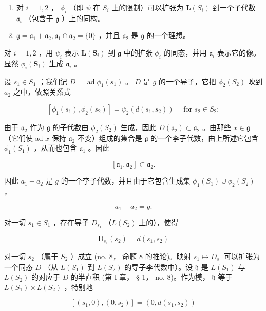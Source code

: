 \begin{enumerate}
\def\labelenumi{(\alph{enumi})}
\item
  对 \(i = 1,2\) ， \(\phi_{i}\) （即 \(\psi\) 在 \(S_{i}\) 上的限制）可以扩张为 \(\mathbf{L}(S_i)\) 到一个子代数 \(\mathfrak{a}_i\) （包含于 \(\mathfrak{g}\) ）上的同构。
\item
  \(\mathfrak{g} = \mathfrak{a}_1 + \mathfrak{a}_2, \mathfrak{a}_1 \cap \mathfrak{a}_2 = \{0\}\) ，并且 \(\mathfrak{a}_2\) 是 \(\mathfrak{g}\) 的一个理想。
\end{enumerate}

对 \(i = 1,2\) ，用 \(\psi_{i}\) 表示 \(\mathbf{L}(\mathbf{S}_i)\) 到 \(\mathfrak{g}\) 中的扩张 \(\phi_i\) 的同态，并用 \(\mathfrak{a}_i\) 表示它的像。显然 \(\phi_i(\mathbf{S}_i)\) 生成 \(\mathfrak{a}_i\) 。

设 \(s_1 \in S_1\) ；我们记 \(D = \operatorname{ad} \phi_1(s_1)\) 。 \(D\) 是 \(g\) 的一个导子，它把 \(\phi_2(S_2)\) 映到 \(a_2\) 之中，依照关系式

\[
[ \phi_ {1} (s _ {1}), \phi_ {2} (s _ {2}) ] = \psi_ {2} (d (s _ {1}, s _ {2})) \quad \text { for } s _ {2} \in S _ {2};
\]

由于 \(\mathfrak{a}_2\) 作为 \(\mathfrak{g}\) 的子代数由 \(\phi_2(S_2)\) 生成，因此 \(D(\mathfrak{a}_2) \subset \mathfrak{a}_2\) 。由那些 \(x \in \mathfrak{g}\) （它们使 ad \(x\) 保持 \(\mathfrak{a}_2\) 不变）组成的集合是 \(\mathfrak{g}\) 的一个李子代数，由上所述它包含 \(\phi_1(S_1)\) ，从而也包含 \(\mathfrak{a}_1\) 。因此

\[
\left[ \mathfrak {a} _ {1}, \mathfrak {a} _ {2} \right] \subset \mathfrak {a} _ {2}.\tag{23}
\]

因此 \(a_1 + a_2\) 是 \(g\) 的一个李子代数，并且由于它包含生成集 \(\phi_1(S_1) \cup \phi_2(S_2)\) ，

\[
a _ {1} + a _ {2} = g.\tag{24}
\]

对一切 \(s_1 \in S_1\) ，存在导子 \(D_{s_1}\) （\(L(S_2)\) 上的），使得

\[
\mathrm{D} _ {s _ {1}} (s _ {2}) = d (s _ {1}, s _ {2})
\]

对一切 \(s_2\) （属于 \(S_2\) ）成立 (no. 8， 命题 8 的推论)。映射 \(s_1 \mapsto D_{s_1}\) 可以扩张为一个同态 \(D\) （从 \(L(S_1)\) 到 \(L(S_2)\) 的导子李代数中）。设 \(\mathfrak{h}\) 是 \(L(S_1)\) 与 \(L(S_2)\) 的对应于 \(D\) 的半直积 (第 I 章， § 1， no. 8)。作为模， \(\mathfrak{h}\) 等于 \(L(S_1) \times L(S_2)\) ，特别地

\[
[ (s _ {1}, 0), (0, s _ {2}) ] = (0, d (s _ {1}, s _ {2}))\tag{25}
\]

